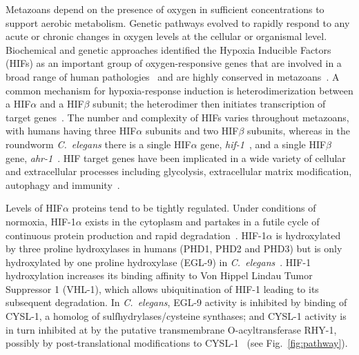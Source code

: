 \documentclass[10pt, onecolumn]{article}
\newcommand{\cel}{\emph{C.~elegans}}
\newcommand{\gene}[1]{\emph{#1}}
\newcommand{\eglp}{EGL-9}
\newcommand{\rhyp}{RHY-1}
\newcommand{\vhlp}{VHL-1}
\newcommand{\hifp}{HIF-1}
\newcommand{\cyslp}{CYSL-1}
\begin{document}
Metazoans depend on the presence of oxygen in sufficient concentrations to
support aerobic metabolism. Genetic pathways evolved to rapidly respond to any
acute or chronic changes in oxygen levels at the cellular or organismal level.
Biochemical and genetic approaches identified the Hypoxia Inducible Factors
(HIFs) as an important group of oxygen-responsive genes that are involved in a
broad range of human pathologies~\cite{Semenza2012} and are highly conserved in
metazoans~\cite{Loenarz2011}. A common mechanism for hypoxia-response induction
is heterodimerization between a HIF$\alpha$ and a HIF$\beta$ subunit; the
heterodimer then initiates transcription of target genes~\cite{Jiang1996}. The
number and complexity of HIFs varies throughout metazoans, with humans having
three HIF$\alpha$ subunits and two HIF$\beta$ subunits, whereas in the roundworm
\cel{} there is a single HIF$\alpha$ gene, \gene{hif-1}~\cite{Jiang2001}, and a
single HIF$\beta$ gene, \gene{ahr-1}~\cite{Powell-Coffman1998}. HIF target genes
have been implicated in a wide variety of cellular and extracellular processes
including glycolysis, extracellular matrix modification, autophagy and
immunity~\cite{Semenza1994,Bishop2004,Shen2005,Bellier2009,Semenza2012}.

Levels of HIF$\alpha$ proteins tend to be tightly regulated. Under conditions of
normoxia, \hifp{}$\alpha$ exists in the cytoplasm and partakes in a futile cycle
of continuous protein production and rapid degradation~\cite{Huang1996}.
\hifp{}$\alpha$ is hydroxylated by three proline hydroxylases in humans (PHD1,
PHD2 and PHD3) but is only hydroxylated by one proline hydroxylase (\eglp{}) in
\cel{}~\cite{Kaelin2008}. \hifp{} hydroxylation increases its binding affinity
to Von Hippel Lindau Tumor Suppressor 1 (\vhlp{}), which allows ubiquitination
of \hifp{} leading to its subsequent degradation. In \cel{}, \eglp{} activity is
inhibited by binding of \cyslp{}, a homolog of sulfhydrylases/cysteine synthases;
and \cyslp{} activity is in turn inhibited at by the putative transmembrane
O-acyltransferase \rhyp{}, possibly by post-translational modifications to
\cyslp{}~\cite{Ma2012} (see Fig.~\ref{fig:pathway}).
\end{document}
